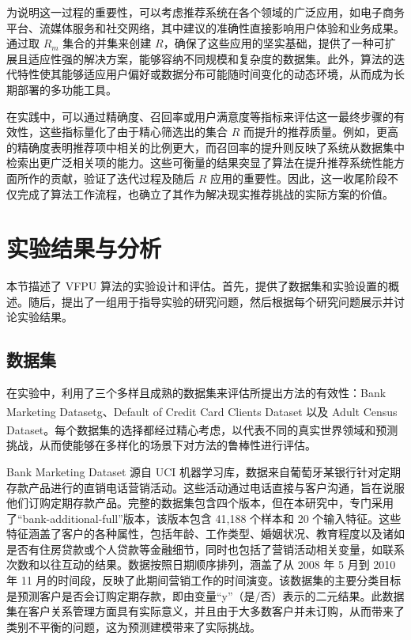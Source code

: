 为说明这一过程的重要性，可以考虑推荐系统在各个领域的广泛应用，如电子商务平台、流媒体服务和社交网络，其中建议的准确性直接影响用户体验和业务成果。通过取 ${{R}_{m}}$ 集合的并集来创建 $R$，确保了这些应用的坚实基础，提供了一种可扩展且适应性强的解决方案，能够容纳不同规模和复杂度的数据集。此外，算法的迭代特性使其能够适应用户偏好或数据分布可能随时间变化的动态环境，从而成为长期部署的多功能工具。

在实践中，可以通过精确度、召回率或用户满意度等指标来评估这一最终步骤的有效性，这些指标量化了由于精心筛选出的集合 $R$ 而提升的推荐质量。例如，更高的精确度表明推荐项中相关的比例更大，而召回率的提升则反映了系统从数据集中检索出更广泛相关项的能力。这些可衡量的结果突显了算法在提升推荐系统性能方面所作的贡献，验证了迭代过程及随后 $R$ 应用的重要性。因此，这一收尾阶段不仅完成了算法工作流程，也确立了其作为解决现实推荐挑战的实际方案的价值。  

\section{实验结果与分析}
本节描述了 VFPU 算法的实验设计和评估。首先，提供了数据集和实验设置的概述。随后，提出了一组用于指导实验的研究问题，然后根据每个研究问题展示并讨论实验结果。
\subsection{数据集}
在实验中，利用了三个多样且成熟的数据集来评估所提出方法的有效性：Bank Marketing Datasetg\textsuperscript{\cite{fitriani2021data}}、Default of Credit Card Clients Dataset\textsuperscript{\cite{subasi2019prediction}} 以及 Adult Census Dataset\textsuperscript{\cite{chakrabarty2018statistical}}。每个数据集的选择都经过精心考虑，以代表不同的真实世界领域和预测挑战，从而使能够在多样化的场景下对方法的鲁棒性进行评估。

Bank Marketing Dataset 源自 UCI 机器学习库，数据来自葡萄牙某银行针对定期存款产品进行的直销电话营销活动。这些活动通过电话直接与客户沟通，旨在说服他们订购定期存款产品。完整的数据集包含四个版本，但在本研究中，专门采用了“bank-additional-full”版本，该版本包含 41,188 个样本和 20 个输入特征。这些特征涵盖了客户的各种属性，包括年龄、工作类型、婚姻状况、教育程度以及诸如是否有住房贷款或个人贷款等金融细节，同时也包括了营销活动相关变量，如联系次数和以往互动的结果。数据按照日期顺序排列，涵盖了从 2008 年 5 月到 2010 年 11 月的时间段，反映了此期间营销工作的时间演变。该数据集的主要分类目标是预测客户是否会订购定期存款，即由变量“y”（是/否）表示的二元结果。此数据集在客户关系管理方面具有实际意义，并且由于大多数客户并未订购，从而带来了类别不平衡的问题，这为预测建模带来了实际挑战。

